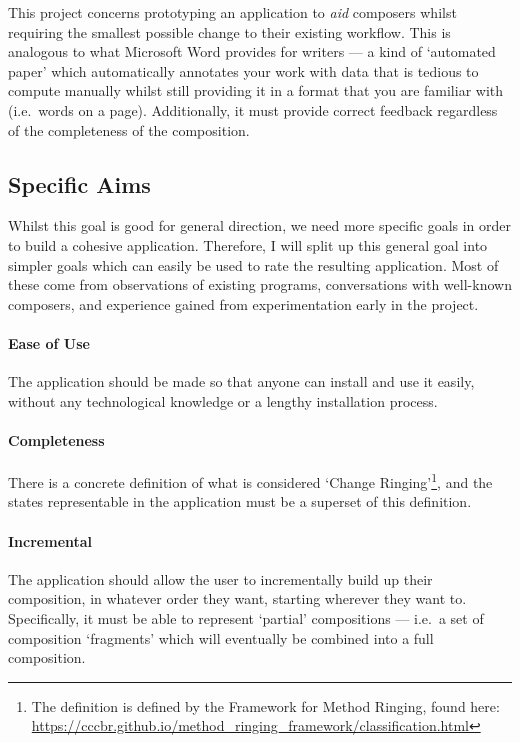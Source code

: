 \documentclass[12pt]{article}
\begin{document}
This project concerns prototyping an application to \emph{aid} composers whilst requiring the
smallest possible change to their existing workflow.  This is analogous to what Microsoft Word
provides for writers --- a kind of `automated paper' which automatically annotates your work with
data that is tedious to compute manually whilst still providing it in a format that you are familiar
with (i.e.\ words on a page).  Additionally, it must provide correct feedback regardless of the
completeness of the composition.

\subsection{Specific Aims}

Whilst this goal is good for general direction, we need more specific goals in order to build a
cohesive application.  Therefore, I will split up this general goal into simpler goals which can
easily be used to rate the resulting application.  Most of these come from observations of existing
programs, conversations with well-known composers, and experience gained from experimentation early
in the project.

\paragraph{Ease of Use} The application should be made so that anyone can install and use it easily,
without any technological knowledge or a lengthy installation process.

\paragraph{Completeness} There is a concrete definition of what is considered `Change
Ringing'\footnote{The definition is defined by the Framework for Method Ringing, found here:
\url{https://cccbr.github.io/method_ringing_framework/classification.html}}, and the states
representable in the application must be a superset of this definition.

\paragraph{Incremental} The application should allow the user to incrementally build up their
composition, in whatever order they want, starting wherever they want to.  Specifically, it must
be able to represent `partial' compositions --- i.e.\ a set of composition `fragments' which will
eventually be combined into a full composition.
\end{document}
